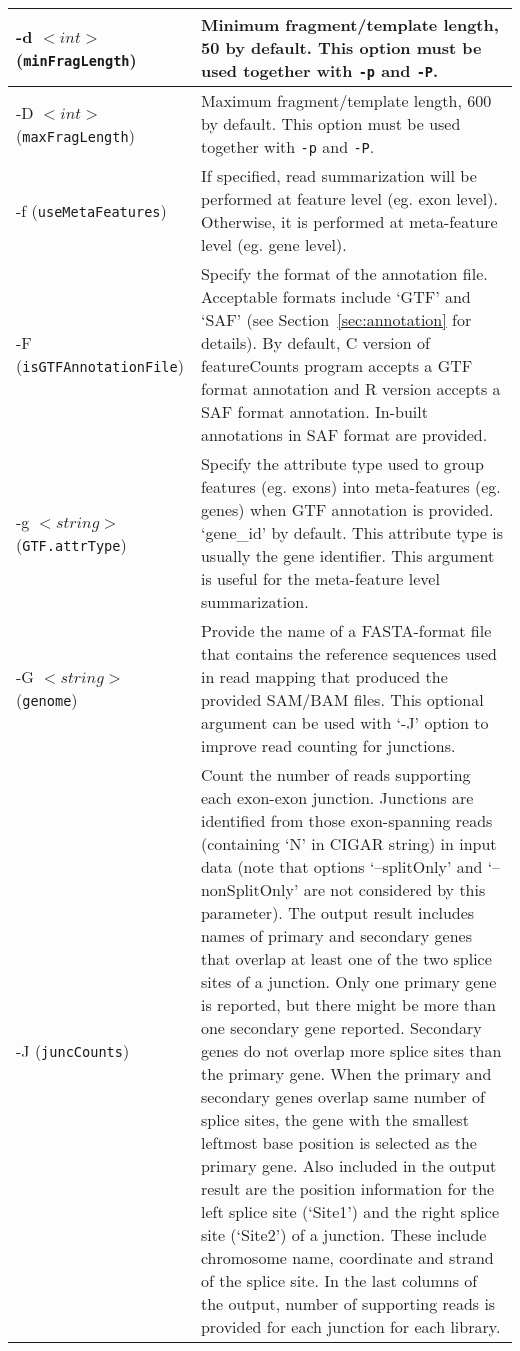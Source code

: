 \documentclass[12pt]{report}
\newcommand{\code}[1]{{\small\texttt{#1}}}
\newcommand{\featureCounts}{\textsf{featureCounts}}
\newcommand{\C}{\textsf{C}}
\begin{document}
\begin{longtable}{|p{5cm}|p{11cm}|}
\hline
-d $<int>$ \newline (\code{minFragLength}) & Minimum fragment/template length, 50 by default. This option must be used together with \code{-p} and \code{-P}.\\
\hline
-D $<int>$ \newline (\code{maxFragLength}) & Maximum fragment/template length, 600 by default. This option must be used together with \code{-p} and \code{-P}.\\
\hline
-f \newline (\code{useMetaFeatures}) & If specified, read summarization will be performed at feature level (eg. exon level). Otherwise, it is performed at meta-feature level (eg. gene level).\\
\hline
-F \newline (\code{isGTFAnnotationFile}) & Specify the format of the annotation file. Acceptable formats include `GTF' and `SAF' (see Section~\ref{sec:annotation} for details). By default, {\C} version of {\featureCounts} program accepts a GTF format annotation and R version accepts a SAF format annotation. In-built annotations in SAF format are provided.\\
\hline
-g $<string>$ \newline (\code{GTF.attrType}) & Specify the attribute type used to group features (eg. exons) into meta-features (eg. genes) when GTF annotation is provided. `gene\_id' by default. This attribute type is usually the gene identifier. This argument is useful for the meta-feature level summarization.\\
\hline
-G $<string>$ \newline (\code{genome}) & Provide the name of a FASTA-format file that contains the reference sequences used in
read mapping that produced the provided SAM/BAM files. This optional argument can be used with `-J' option to improve read counting for junctions.\\
\hline
-J \newline (\code{juncCounts}) & Count the number of reads supporting each exon-exon junction. Junctions are identified from those exon-spanning reads (containing `N' in CIGAR string) in input data (note that options `--splitOnly' and `--nonSplitOnly' are not considered by this parameter). The output result includes names of primary and secondary genes that overlap at least one of the two splice sites of a junction. Only one primary gene is reported, but there might be more than one secondary gene reported. Secondary genes do not overlap more splice sites than the primary gene. When the primary and secondary genes overlap same number of splice sites, the gene with the smallest leftmost base position is selected as the primary gene. Also included in the output result are the position information for the left splice site (`Site1') and the right splice site (`Site2') of a junction. These include chromosome name, coordinate and strand of the splice site. In the last columns of the output, number of supporting reads is provided for each junction for each library.\\

\end{longtable}
\end{document}
